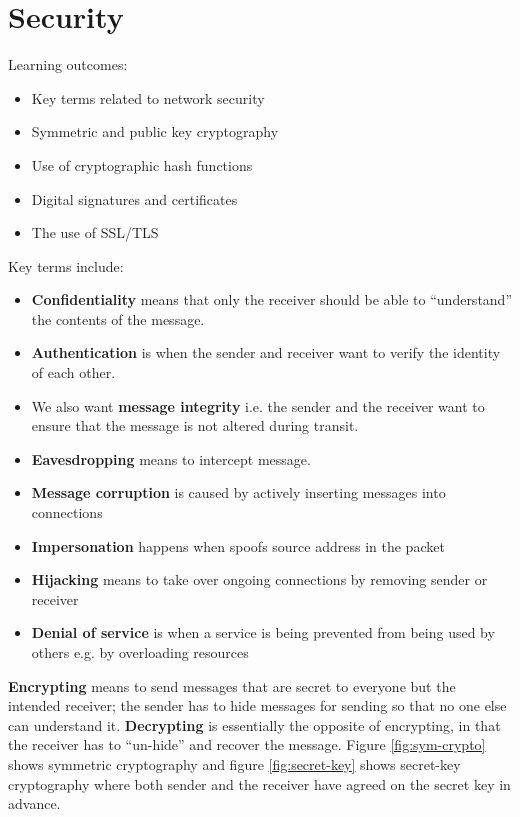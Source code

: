 \documentclass[twoside]{article}
\begin{document}
\section{Security}
Learning outcomes:
\begin{itemize}
    \item Key terms related to network security
    \item Symmetric and public key cryptography
    \item Use of cryptographic hash functions
    \item Digital signatures and certificates
    \item The use of SSL/TLS
\end{itemize}
Key terms include:
\begin{itemize}
    \item \textbf{Confidentiality} means that only the receiver should be able to 
    ``understand'' the contents of the message.
    \item \textbf{Authentication} is when the sender and receiver want to 
    verify the identity of each other.
    \item We also want \textbf{message integrity} i.e. the sender and the 
    receiver want to ensure that the message is not altered during transit.
    \item \textbf{Eavesdropping} means to intercept message.
    \item \textbf{Message corruption} is caused by actively inserting messages
    into connections
    \item \textbf{Impersonation} happens when spoofs source address in the 
    packet
    \item \textbf{Hijacking} means to take over ongoing connections by removing
    sender or receiver
    \item \textbf{Denial of service} is when a service is being prevented from
    being used by others e.g. by overloading resources
\end{itemize}
\textbf{Encrypting} means to send messages that are secret to everyone but
the intended receiver; the sender has to hide messages for sending so that 
no one else can understand it. \textbf{Decrypting} is essentially the opposite
of encrypting, in that the receiver has to ``un-hide'' and recover the message.
Figure \ref{fig:sym-crypto} shows symmetric cryptography and figure 
\ref{fig:secret-key} shows secret-key cryptography where both sender and the
receiver have agreed on the secret key in advance.
\end{document}
